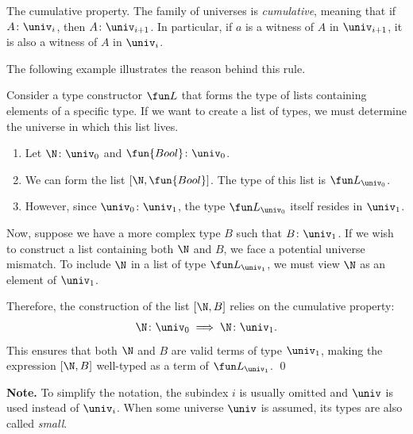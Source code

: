 \begin{lpar}{The cumulative property.}\label{lpar:cumulative-property}
    The family of universes is \textsl{cumulative}, meaning that if $A\colon\univ_i$, then $A\colon\univ_{i+1}$. In particular, if $a$ is a witness of $A$ in $\univ_{i+1}$, it is also a witness of $A$ in $\univ_i$.
    
    The following example illustrates the reason behind this rule.
    
    \begin{xmpl}
        Consider a type constructor $\fun L$ that forms the type of lists containing elements of a specific type. If we want to create a list of types, we must determine the universe in which this list lives.
        
        \begin{enumerate}[-]
            \item Let $\N\colon\univ_0$ and $\fun{Bool}\colon\univ_0$.
            
            \item We can form the list $[\N, \fun{Bool}]$. The type of this list is $\fun L_{\univ_0}$.
            
            \item However, since $\univ_0\colon\univ_1$, the type $\fun L_{\univ_0}$ itself resides in $\univ_1$.
        \end{enumerate}
        Now, suppose we have a more complex type $B$ such that $B\colon\univ_1$. If we wish to construct a list containing both $\N$ and $B$, we face a potential universe mismatch. To include $\N$ in a list of type $\fun L_{\univ_1}$, we must view $\N$ as an element of $\univ_1$.
        
        Therefore, the construction of the list $[\N,B]$ relies on the cumulative property:
        \[
            \N\colon\univ_0 \implies \N\colon\univ_1.
        \]
        This ensures that both $\N$ and $B$ are valid terms of type $\univ_1$, making the expression $[\N,B]$ well-typed as a term of $\fun L_{\univ_1}$. \qed
    \end{xmpl}

    \textbf{Note.} To simplify the notation, the subindex $i$ is usually omitted and $\univ$ is used instead of $\univ_i$. When some universe $\univ$ is assumed, its types are also called \textsl{small}.
\end{lpar}

